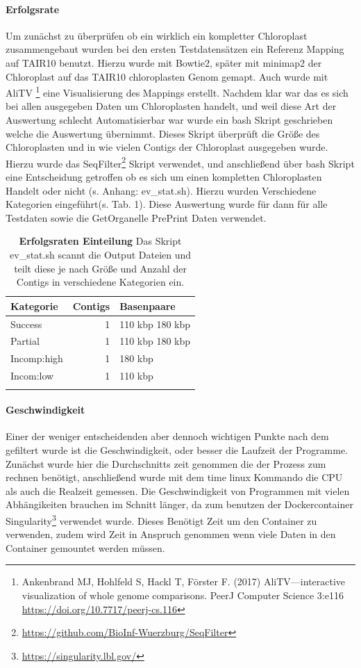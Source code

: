 \documentclass{scrartcl}
\begin{document}
\paragraph{Erfolgsrate}
\label{sec-2-1-2-2}
Um zunächst zu überprüfen ob ein wirklich ein kompletter Chloroplast zusammengebaut wurden bei den ersten Testdatensätzen ein Referenz Mapping auf
TAIR10 benutzt. Hierzu wurde mit Bowtie2, später mit minimap2 der Chloroplast auf das TAIR10 chloroplasten Genom gemapt. Auch wurde mit AliTV \footnote{Ankenbrand MJ, Hohlfeld S, Hackl T, Förster F. (2017) AliTV—interactive visualization of whole genome comparisons. PeerJ Computer Science 3:e116 \url{https://doi.org/10.7717/peerj-cs.116}} 
eine Visualisierung des Mappings erstellt. Nachdem klar war das es sich bei allen ausgegeben Daten um Chloroplasten handelt, und weil diese Art der 
Auswertung schlecht Automatisierbar war wurde ein bash Skript geschrieben welche die Auswertung übernimmt. Dieses Skript überprüft die Größe des
Chloroplasten und in wie vielen Contigs der Chloroplast ausgegeben wurde. Hierzu wurde das SeqFilter\footnote{\url{https://github.com/BioInf-Wuerzburg/SeqFilter}} Skript verwendet, und anschließend über bash
Skript eine Entscheidung getroffen ob es sich um einen kompletten Chloroplasten Handelt oder nicht (s. Anhang: ev\_stat.sh). Hierzu wurden Verschiedene
Kategorien eingeführt(s. Tab. 1). Diese Auswertung wurde für dann für alle Testdaten sowie die GetOrganelle PrePrint Daten verwendet.
\begin{table}[!h]
\caption[Erfolgsraten Einteilung]{\textbf{Erfolgsraten Einteilung} Das Skript ev\_stat.sh scannt die Output Dateien und teilt diese je nach Größe und Anzahl der Contigs in verschiedene Kategorien ein. }
\begin{center}
\begin{tabular}{lrl}
Kategorie & Contigs & Basenpaare\\
\hline
Success & 1 & 110 kbp  180 kbp\\
Partial & 1 & 110 kbp  180 kbp\\
Incomp:high & 1 & 180 kbp\\
Incom:low & 1 & 110 kbp\\
 &  & \\
\end{tabular}
\end{center}
\end{table}

\paragraph{Geschwindigkeit}
\label{sec-2-1-2-3}
Einer der weniger entscheidenden aber dennoch wichtigen Punkte nach dem gefiltert wurde ist die Geschwindigkeit, 
oder besser die Laufzeit der Programme. Zunächst wurde hier die Durchschnitts zeit genommen die der Prozess zum rechnen benötigt,
anschließend wurde mit dem time linux Kommando die CPU als auch die Realzeit gemessen. Die Geschwindigkeit von Programmen mit vielen Abhängikeiten 
brauchen im Schnitt länger, da zum benutzen der Dockercontainer Singularity\footnote{\url{https://singularity.lbl.gov/}} verwendet wurde. Dieses Benötigt Zeit um den Container zu verwenden,
zudem wird Zeit in Anspruch genommen wenn viele Daten in den Container gemountet werden müssen.
\end{document}
